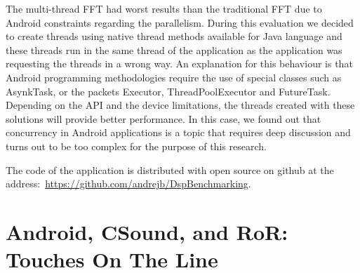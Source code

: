 The multi-thread FFT had worst results than the traditional FFT due to Android constraints regarding the parallelism.
During this evaluation we decided to create threads using native thread methods available for Java language and these threads run in the same thread of the application as the application was requesting the threads in a wrong way.
An explanation for this behaviour is that Android programming methodologies require the use of special classes such as AsynkTask, or the packets Executor, ThreadPoolExecutor and FutureTask.
Depending on the API and the device limitations, the threads created with these solutions will provide better performance.
In this case, we found out that concurrency in Android applications is a topic that requires deep discussion and turns out to be too complex for the purpose of this research.


The code of the application is distributed with open source on github at the address:~\url{https://github.com/andrejb/DspBenchmarking}.

\section{Android, CSound, and RoR: Touches On The Line}
\label{sec:apptouchesontheline}

